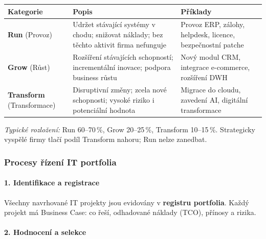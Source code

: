 \begin{center}
\begin{tabular}{p{2.8cm}p{4.2cm}p{5.2cm}}
\toprule
\textbf{Kategorie} & \textbf{Popis} & \textbf{Příklady} \\
\midrule
\textbf{Run} \newline (Provoz) &
  Udržet stávající systémy v chodu; snižovat náklady; bez těchto aktivit firma nefunguje &
  Provoz ERP, zálohy, helpdesk, licence, bezpečnostní patche \\
\midrule
\textbf{Grow} \newline (Růst) &
  Rozšíření stávajících schopností; incrementální inovace; podpora business růstu &
  Nový modul CRM, integrace e-commerce, rozšíření DWH \\
\midrule
\textbf{Transform} \newline (Transformace) &
  Disruptivní změny; zcela nové schopnosti; vysoké riziko i potenciální hodnota &
  Migrace do cloudu, zavedení AI, digitální transformace \\
\bottomrule
\end{tabular}
\end{center}

\textit{Typické rozložení:} Run 60--70\,\%, Grow 20--25\,\%, Transform 10--15\,\%.
Strategicky vyspělé firmy tlačí podíl Transform nahoru; Run nelze zanedbat.

\subsubsection{Procesy řízení IT portfolia}

\paragraph{1. Identifikace a registrace}
Všechny navrhované IT projekty jsou evidovány v \textbf{registru portfolia}.
Každý projekt má Business Case: co řeší, odhadované náklady (TCO), přínosy a rizika.

\paragraph{2. Hodnocení a selekce}

